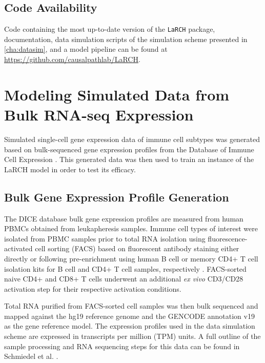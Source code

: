 \subsection{Code Availability}

Code containing the most up-to-date version of the \texttt{LaRCH} package, documentation, data simulation scripts of the simulation scheme presented in \ref{cha:datasim}, and a model pipeline can be found at \url{https://github.com/causalpathlab/LaRCH}.

\newpage
\section[Modeling Simulated Data]{Modeling Simulated Data from Bulk RNA-seq Expression}

Simulated single-cell gene expression data of immune cell subtypes was generated based on bulk-sequenced gene expression profiles from the Database of Immune Cell Expression \cite{DICE1}. This generated data was then used to train an instance of the LaRCH model in order to test its efficacy. 

\subsection{Bulk Gene Expression Profile Generation}
The DICE database bulk gene expression profiles are measured from human PBMCs obtained from leukapheresis samples. Immune cell types of interest were isolated from PBMC samples prior to total RNA isolation using fluorescence-activated cell sorting (FACS) based on fluorescent antibody staining either directly or following pre-enrichment using human B cell or memory CD4+ T cell isolation kits for B cell and CD4+ T cell samples, respectively \cite{DICE1}. FACS-sorted naive CD4+ and CD8+ T cells underwent an additional \textit{ex vivo} CD3/CD28 activation step for their respective activation conditions. 

Total RNA purified from FACS-sorted cell samples was then bulk sequenced and mapped against the hg19 reference genome and the GENCODE annotation v19 as the gene reference model. The expression profiles used in the data simulation scheme are expressed in transcripts per million (TPM) units. A full outline of the sample processing and RNA sequencing steps for this data can be found in Schmiedel et al. \cite{DICE1}.



